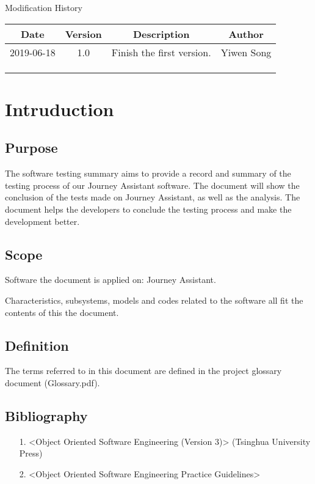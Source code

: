 \documentclass[10pt]{article}
\begin{document}
\newpage

\begin{center}
    {\LARGE Modification History}
    
    \begin{tabular}{|c|c|c|c|} 
        \hline 
        Date&Version&Description&Author\\
        \hline  
        2019-06-18&1.0&Finish the first version.&Yiwen Song\\
		\hline 
		& & & \\
		\hline
		& & & \\
		\hline
		& & & \\
		\hline
    \end{tabular}    
\end{center}

\newpage

\tableofcontents
\newpage

\section{Intruduction}
\subsection{Purpose}
The software testing summary aims to provide a record and summary of the testing process of our Journey Assistant software. The document will show the conclusion of the tests made on Journey Assistant, as well as the analysis. The document helps the developers to conclude the testing process and make the development better.

\subsection{Scope}
Software the document is applied on: Journey Assistant.

Characteristics, subsystems, models and codes related to the software all fit the contents of this the document.

\subsection{Definition}
The terms referred to in this document are defined in the project glossary document (Glossary.pdf).

\subsection{Bibliography}
\begin{itemize}
	\item[1.] <Object Oriented Software Engineering (Version 3)> (Tsinghua University Press)
	\item[2.] <Object Oriented Software Engineering Practice Guidelines> 
\end{itemize}
\end{document}
